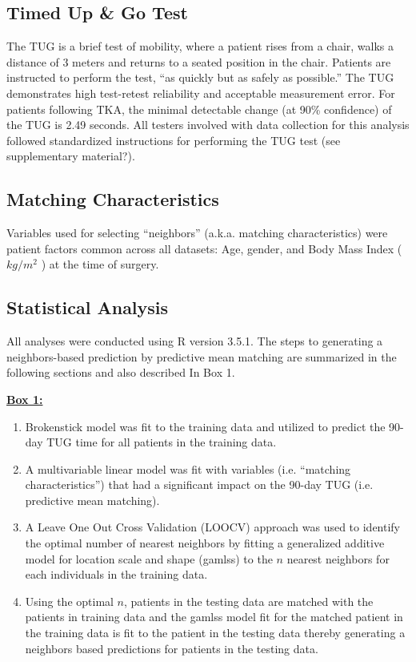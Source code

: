 \documentclass[fleqn,10pt]{wlscirep}\usepackage{knitr}
\begin{document}
\subsection*{Timed Up \& Go Test}

The TUG is a brief test of mobility, where a patient rises from a chair, walks a distance of 3 meters and returns to a seated position in the chair.  Patients are instructed to perform the test, ``as quickly but as safely as possible.'' The TUG demonstrates high test-retest reliability and acceptable measurement error\cite{kennedy2005assessing,naylor2014minimal}. For patients following TKA, the minimal detectable change (at 90\% confidence) of the TUG is 2.49 seconds\cite{kennedy2005assessing}. All testers involved with data collection for this analysis followed standardized instructions for performing the TUG test (see supplementary material?).

\subsection*{Matching Characteristics}

Variables used for selecting ``neighbors'' (a.k.a. matching characteristics) were patient factors common across all datasets: Age, gender, and Body Mass Index ( $kg/m^2$ ) at the time of surgery.


\subsection*{Statistical Analysis}

All analyses were conducted using R version 3.5.1. The steps to generating a neighbors-based prediction by predictive mean matching are summarized in the following sections and also described In Box 1. 

\begin{tcolorbox}
    \underline{\textbf{Box 1:}}
    \begin{enumerate}
        \setlength{\itemsep}{1pt}
        \setlength{\parskip}{0pt}
        \setlength{\parsep}{0pt}
        \item Brokenstick model was fit to the training data and utilized to predict the 90-day TUG time for all patients in the training data.
        \item A multivariable linear model was fit with variables (i.e. ``matching characteristics'') that had a significant impact on the 90-day TUG (i.e. predictive mean matching).
        \item A Leave One Out Cross Validation (LOOCV) approach was used to identify the optimal number of nearest neighbors by fitting a generalized additive model for location scale and shape (gamlss) to the $n$ nearest neighbors for each individuals in the training data.
        \item Using the optimal $n$, patients in the testing data are matched with the patients in training data and the gamlss model fit for the matched patient in the training data is fit to the patient in the testing data thereby generating a neighbors based predictions for patients in the testing data.
    \end{enumerate}
\end{tcolorbox}
\end{document}
